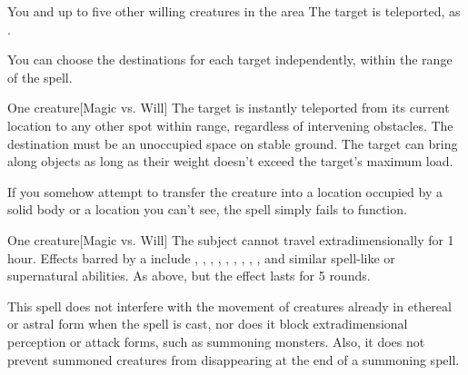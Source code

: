 \begin{spelltarget}{You and up to five other willing creatures in the area}
    \spelleffect The target is teleported, as .
\end{spelltarget}
\spellnotes You can choose the destinations for each target independently, within the range of the spell. 

\spellrng{\rngclose}
\begin{spelltarget}{One creature}[Magic vs. Will]
    \spelleffect The target is instantly teleported from its current location to any other spot within range, regardless of intervening obstacles. The destination must be an unoccupied space on stable ground. The target can bring along objects as long as their weight doesn't exceed the target's maximum load.
\end{spelltarget}
\spellnotes If you somehow attempt to transfer the creature into a location occupied by a solid body or a location you can't see, the spell simply fails to function.

\spellrng{\rngmed}
\begin{spelltarget}{One creature}[Magic vs. Will]
    \spellsuccess  The subject cannot travel extradimensionally for 1 hour. Effects barred by a  include , , , , , , , , , and similar spell-like or supernatural abilities.
    \spellfailure As above, but the effect lasts for 5 rounds.
\end{spelltarget}
\spellnotes This spell does not interfere with the movement of creatures already in ethereal or astral form when the spell is cast, nor does it block extradimensional perception or attack forms, such as summoning monsters. Also, it does not prevent summoned creatures from disappearing at the end of a summoning spell.

